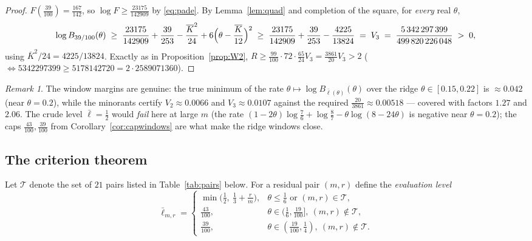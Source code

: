 \documentclass[11pt]{article}
\theoremstyle{remark}
\newtheorem{remark}[theorem]{Remark}
\theoremstyle{plain}
\theoremstyle{plain}
\newcommand{\lbar}{\bar\ell}
\begin{document}
\begin{proof}
$F(\tfrac{39}{100})=\tfrac{167}{142}$, so $\log F\ge\tfrac{23175}{142909}$ by \eqref{eq:pade}.  By Lemma~\ref{lem:quad} and completion of the square, for \emph{every} real $\theta$,
\[
        \log B_{39/100}(\theta)
        \;\ge\;\frac{23175}{142909}+\frac{39}{253}
        -\frac{\overline K^2}{24}
        +6\Bigl(\theta-\frac{\overline K}{12}\Bigr)^2
        \;\ge\;\frac{23175}{142909}+\frac{39}{253}-\frac{4225}{13824}
        \;=\;V_3\;=\;\frac{5\,342\,297\,399}{499\,820\,226\,048}\;>\;0,
\]
using $\overline K^2/24=4225/13824$.  Exactly as in Proposition~\ref{prop:W2},
$R\ge\tfrac{99}{100}\cdot72\cdot\tfrac{65}{24}V_3=\tfrac{3861}{20}V_3>2$
($\iff5342297399\ge5178142720=2\cdot2589071360$).
\end{proof}

\begin{remark}
The window margins are genuine: the true minimum of the rate $\theta\mapsto\log B_{\lbar(\theta)}(\theta)$ over the ridge $\theta\in[0.15,0.22]$ is $\approx0.042$ (near $\theta=0.2$), while the minorants certify $V_2\approx0.0066$ and $V_3\approx0.0107$ against the required $\tfrac{20}{3861}\approx0.00518$ --- covered with factors $1.27$ and $2.06$.  The crude level $\lbar=\tfrac12$ would \emph{fail} here at large $m$ (the rate $(1-2\theta)\log\tfrac76+\log\tfrac87-\theta\log(8-24\theta)$ is negative near $\theta=0.2$); the caps $\tfrac{43}{100},\tfrac{39}{100}$ from Corollary~\ref{cor:capwindows} are what make the ridge windows close.
\end{remark}

\subsection{The criterion theorem}\label{sec:crit}

Let $\mathcal T$ denote the set of $21$ pairs listed in Table~\ref{tab:pairs} below.  For a residual pair $(m,r)$ define the \emph{evaluation level}
\begin{equation}\label{eq:lbar}
        \lbar_{m,r}=
        \begin{cases}
        \min\bigl(\tfrac12,\ \tfrac13+\tfrac rm\bigr), & \theta\le\tfrac16
                \text{ or } (m,r)\in\mathcal T,\\[1mm]
        \tfrac{43}{100}, & \theta\in(\tfrac16,\tfrac{19}{100}],\ (m,r)\notin\mathcal T,\\[1mm]
        \tfrac{39}{100}, & \theta\in(\tfrac{19}{100},\tfrac14),\ (m,r)\notin\mathcal T .
        \end{cases}
\end{equation}
\end{document}
